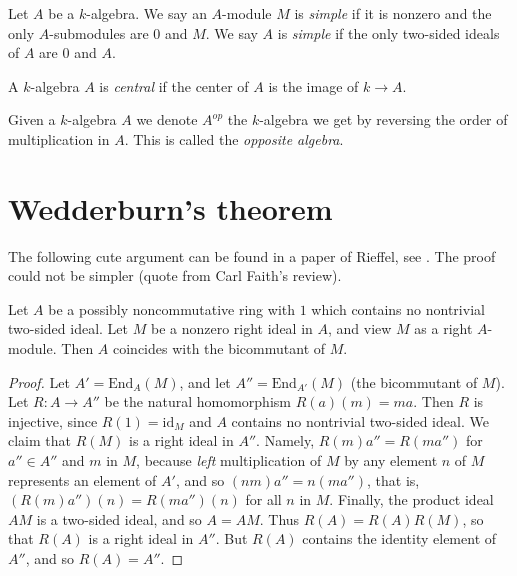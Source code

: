 \begin{definition}
\label{definition-simple}
Let $A$ be a $k$-algebra.
We say an $A$-module $M$ is {\it simple} if it is nonzero and
the only $A$-submodules are $0$ and $M$.
We say $A$ is {\it simple} if the only two-sided ideals of $A$ are
$0$ and $A$.
\end{definition}

\begin{definition}
\label{definition-central}
A $k$-algebra $A$ is {\it central} if the center of $A$ is the image of
$k \to A$.
\end{definition}

\begin{definition}
\label{definition-opposite}
Given a $k$-algebra $A$ we denote $A^{op}$ the $k$-algebra we get by
reversing the order of multiplication in $A$. This is called the
{\it opposite algebra}.
\end{definition}




\section{Wedderburn's theorem}
\label{section-weddenburg}

\noindent
The following cute argument can be found in a paper of Rieffel, see
\cite{Rieffel}. The proof could not be simpler (quote from
Carl Faith's review).

\begin{lemma}
\label{lemma-rieffel}
Let $A$ be a possibly noncommutative ring with $1$ which contains no
nontrivial two-sided ideal. Let $M$ be a nonzero right ideal in $A$,
and view $M$ as a right $A$-module. Then $A$ coincides with the
bicommutant of $M$.
\end{lemma}

\begin{proof}
Let $A' = \text{End}_A(M)$, and let $A'' = \text{End}_{A'}(M)$
(the bicommutant of $M$). Let $R : A \to A''$ be the natural homomorphism
$R(a)(m) = ma$. Then $R$ is injective, since $R(1) = \text{id}_M$
and $A$ contains no nontrivial two-sided ideal. We claim that $R(M)$
is a right ideal in $A''$. Namely, $R(m)a'' = R(ma'')$ for $a'' \in A''$
and $m$ in $M$, because {\it left} multiplication of $M$ by any element $n$
of $M$ represents an element of $A'$, and so
$(nm)a'' = n(ma'')$, that is, $(R(m)a'') (n) = R(ma'') (n)$ for all
$n$ in $M$. Finally, the product ideal $AM$ is a two-sided ideal, and so
$A = AM$. Thus $R(A) = R(A)R(M)$, so that $R(A)$ is a right ideal in $A''$.
But $R(A)$ contains the identity element of $A''$, and so $R(A) = A''$.
\end{proof}

